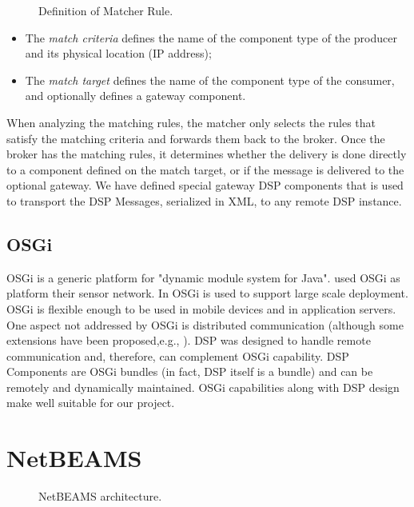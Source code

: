 \documentclass[conference]{IEEEtran}
\begin{document}
\begin{figure}[!htb]
 \caption{\label{FIG_MATCHER_RULE} Definition of Matcher Rule.}
\end{figure}

\begin{itemize}
\item The \emph{match criteria} defines the name of the component type
  of the producer and its physical location (IP address);
\item The \emph{match target} defines the name of the component type
  of the consumer, and optionally defines a gateway component.
\end{itemize}

When analyzing the matching rules, the matcher only selects the rules
that satisfy the matching criteria and forwards them back to the
broker. Once the broker has the matching rules, it determines whether
the delivery is done directly to a component defined on the match
target, or if the message is delivered to the optional gateway. We
have defined special gateway DSP components that is used to transport
the DSP Messages, serialized in XML, to any remote DSP instance.

\subsection{OSGi}

OSGi \cite{osgi} is a generic platform for "dynamic module system for Java\texttrademark".
\cite{Mueller07} used OSGi as platform their sensor network.
In \cite{Baude07} OSGi is used to support large scale deployment. OSGi is flexible
enough to be used in mobile devices and in application servers. One aspect not addressed
by OSGi is distributed communication (although some extensions have
been proposed,e.g., \cite{Rellermeyer}). DSP was designed to handle remote communication and,
therefore, can complement OSGi capability. DSP Components are OSGi bundles (in fact, DSP itself
is a bundle) and can be remotely and dynamically maintained. OSGi capabilities along with DSP
design make well suitable for our project.

\section{NetBEAMS}
\label{SEC_NETBEAMS}

\begin{figure*} 
\centering
{}
\caption{\label{FIG_NETBEAMS} NetBEAMS architecture.}
\end{figure*}
\end{document}
